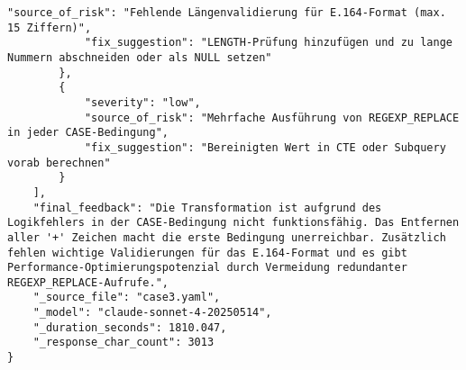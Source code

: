 \begin{lstlisting}[caption={Ausgabe: Claude Sonnet 4 Anwendungsfall 3 Konsistenzdurchlauf},label={claude_case3_prompt2}]
            "source_of_risk": "Fehlende Längenvalidierung für E.164-Format (max. 15 Ziffern)",
            "fix_suggestion": "LENGTH-Prüfung hinzufügen und zu lange Nummern abschneiden oder als NULL setzen"
        },
        {
            "severity": "low",
            "source_of_risk": "Mehrfache Ausführung von REGEXP_REPLACE in jeder CASE-Bedingung",
            "fix_suggestion": "Bereinigten Wert in CTE oder Subquery vorab berechnen"
        }
    ],
    "final_feedback": "Die Transformation ist aufgrund des Logikfehlers in der CASE-Bedingung nicht funktionsfähig. Das Entfernen aller '+' Zeichen macht die erste Bedingung unerreichbar. Zusätzlich fehlen wichtige Validierungen für das E.164-Format und es gibt Performance-Optimierungspotenzial durch Vermeidung redundanter REGEXP_REPLACE-Aufrufe.",
    "_source_file": "case3.yaml",
    "_model": "claude-sonnet-4-20250514",
    "_duration_seconds": 1810.047,
    "_response_char_count": 3013
}
\end{lstlisting}

